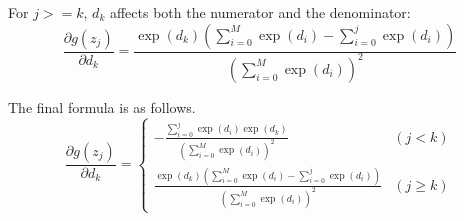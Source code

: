 \documentclass[sigconf]{acmart}
\begin{document}
For $j>=k$, $d_k$ affects both the numerator and the denominator:
\begin{equation}\label{eqn-25} 
\frac{\partial g\left(z_{j}\right)}{\partial d_{k}}=\frac{\exp\left(d_{k}\right) \left( \sum_{i=0}^{M} \exp\left(d_{i}\right) - \sum_{i=0}^{j} \exp \left(d_{i}\right) \right)}{\left(\sum_{i=0}^{M} \exp\left(d_{i}\right)\right)^{2}}
\end{equation}



The final formula is as follows.
\begin{equation} \label{eq:partial_g}
\frac{\partial g\left(z_{j}\right)}{\partial d_{k}} =
\begin{cases}
-\frac{\sum_{i=0}^{j} \exp \left(d_{i}\right) \exp \left(d_{k}\right)}{\left(\sum_{i=0}^{M} \exp \left(d_{i}\right)\right)^{2}} & (j < k) \\
\frac{\exp\left(d_{k}\right) \left( \sum_{i=0}^{M} \exp\left(d_{i}\right) - \sum_{i=0}^{j} \exp \left(d_{i}\right) \right)}{\left(\sum_{i=0}^{M} \exp\left(d_{i}\right)\right)^{2}} & (j \ge k)
\end{cases}
\end{equation}



\end{document}
